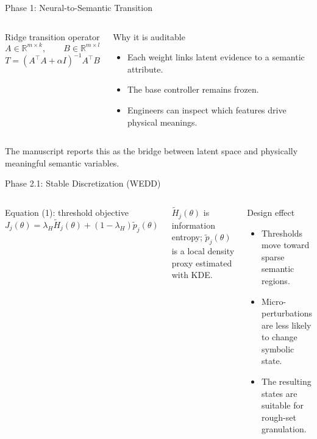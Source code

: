 \documentclass[aspectratio=169,xcolor=dvipsnames]{beamer}
\newcommand{\compactitem}{\setlength{\itemsep}{0.35em}}
\begin{document}
\begin{frame}{Phase 1: Neural-to-Semantic Transition}
\small
\begin{columns}[T,onlytextwidth]
\begin{block}{Ridge transition operator}
\small
\[
  A\in\mathbb{R}^{m\times k},\qquad B\in\mathbb{R}^{m\times l}
\]
\[
  T = (A^\top A+\alpha I)^{-1}A^\top B
\]
\end{block}
\begin{block}{Why it is auditable}
\small
\begin{itemize}\compactitem
  \item Each weight links latent evidence to a semantic attribute.
  \item The base controller remains frozen.
  \item Engineers can inspect which features drive physical meanings.
\end{itemize}
\end{block}
\end{columns}
\vspace{0.25em}
{\scriptsize The manuscript reports this as the bridge between latent space and physically meaningful semantic variables.\par}
\end{frame}

\begin{frame}{Phase 2.1: Stable Discretization (WEDD)}
\small
\begin{columns}[T,onlytextwidth]
\begin{block}{Equation (1): threshold objective}
\small
\[
  J_j(\theta)=
  \lambda_H\widetilde{H}_j(\theta)+
  (1-\lambda_H)\widetilde{p}_j(\theta)
  \tag{1}
\]
\end{block}
{\scriptsize \(\widetilde{H}_j(\theta)\) is information entropy; \(\widetilde{p}_j(\theta)\) is a local density proxy estimated with KDE.\par}
\begin{exampleblock}{Design effect}
\small
\begin{itemize}\compactitem
  \item Thresholds move toward sparse semantic regions.
  \item Micro-perturbations are less likely to change symbolic state.
  \item The resulting states are suitable for rough-set granulation.
\end{itemize}
\end{exampleblock}
\end{columns}
\end{frame}
\end{document}
